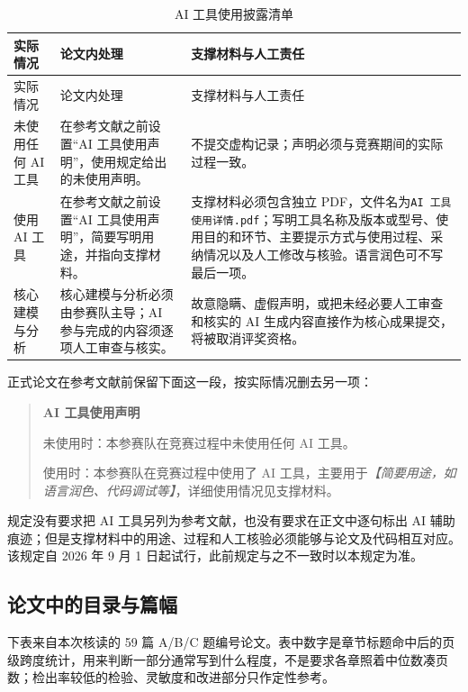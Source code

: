 \documentclass[UTF8,zihao=-4]{ctexart}
\newcommand{\slot}[1]{\textcolor{inkblue}{\textit{【#1】}}}
\begin{document}
\begin{longtable}{p{2.7cm}p{5.7cm}p{6.2cm}}
\caption{AI 工具使用披露清单}\label{tab:official-ai-rules}\\
\toprule
实际情况 & 论文内处理 & 支撑材料与人工责任\\
\midrule
\endfirsthead
\toprule
实际情况 & 论文内处理 & 支撑材料与人工责任\\
\midrule
\endhead
未使用任何 AI 工具 & 在参考文献之前设置“AI 工具使用声明”，使用规定给出的未使用声明。 & 不提交虚构记录；声明必须与竞赛期间的实际过程一致。\\
使用 AI 工具 & 在参考文献之前设置“AI 工具使用声明”，简要写明用途，并指向支撑材料。 & 支撑材料必须包含独立 PDF，文件名为\texttt{AI 工具使用详情.pdf}；写明工具名称及版本或型号、使用目的和环节、主要提示方式与使用过程、采纳情况以及人工修改与核验。语言润色可不写最后一项。\\
核心建模与分析 & 核心建模与分析必须由参赛队主导；AI 参与完成的内容须逐项人工审查与核实。 & 故意隐瞒、虚假声明，或把未经必要人工审查和核实的 AI 生成内容直接作为核心成果提交，将被取消评奖资格。\\
\bottomrule
\end{longtable}

正式论文在参考文献前保留下面这一段，按实际情况删去另一项：
\begin{quote}\small
\textbf{AI 工具使用声明}

未使用时：本参赛队在竞赛过程中未使用任何 AI 工具。

使用时：本参赛队在竞赛过程中使用了 AI 工具，主要用于\slot{简要用途，如语言润色、代码调试等}，详细使用情况见支撑材料。
\end{quote}
规定没有要求把 AI 工具另列为参考文献，也没有要求在正文中逐句标出 AI 辅助痕迹；但是支撑材料中的用途、过程和人工核验必须能够与论文及代码相互对应。该规定自 2026 年 9 月 1 日起试行，此前规定与之不一致时以本规定为准。

\subsection{论文中的目录与篇幅}

下表来自本次核读的 59 篇 A/B/C 题编号论文。表中数字是章节标题命中后的页级跨度统计，用来判断一部分通常写到什么程度，不是要求各章照着中位数凑页数；检出率较低的检验、灵敏度和改进部分只作定性参考。
\end{document}
